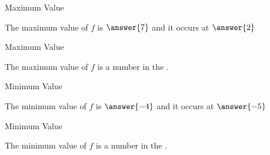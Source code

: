 \documentclass{ximera}
\begin{document}
\begin{exercise} Maximum Value

The maximum value of $f$ is $\answer{7}$ and it occurs at $\answer{2}$


\end{exercise}







\begin{exercise} Maximum Value

The maximum value of $f$ is a number in the .


\end{exercise}






\begin{exercise} Minimum Value

The minimum value of $f$ is $\answer{-4}$ and it occurs at $\answer{-5}$


\end{exercise}






\begin{exercise} Minimum Value

The minimum value of $f$ is a number in the .


\end{exercise}
\end{document}
